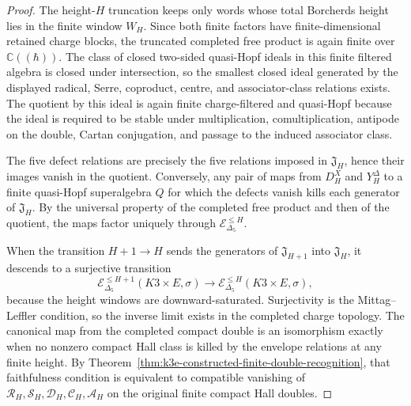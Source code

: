 \begin{proof}
The height-\(H\) truncation keeps only words whose total Borcherds
height lies in the finite window \(W_H\). Since both finite factors have
finite-dimensional retained charge blocks, the truncated completed free
product is again finite over \(\mathbb C((\hbar))\). The class of closed
two-sided quasi-Hopf ideals in this finite filtered algebra is closed
under intersection, so the smallest closed ideal generated by the
displayed radical, Serre, coproduct, centre, and associator-class
relations exists. The quotient by this ideal is again finite
charge-filtered and quasi-Hopf because the ideal is required to be
stable under multiplication, comultiplication, antipode on the double,
Cartan conjugation, and passage to the induced associator class.

The five defect relations are precisely the five relations imposed in
\(\mathfrak J_H\), hence their images vanish in the quotient. Conversely,
any pair of maps from \(D_H^X\) and \(Y_H^\Delta\) to a finite
quasi-Hopf superalgebra \(Q\) for which the defects vanish kills each
generator of \(\mathfrak J_H\). By the universal property of the
completed free product and then of the quotient, the maps factor
uniquely through \(\mathcal E^{\leq H}_{\Delta_5}\).

When the transition \(H+1\to H\) sends the generators of
\(\mathfrak J_{H+1}\) into \(\mathfrak J_H\), it descends to a
surjective transition
\[
 \mathcal E^{\leq H+1}_{\Delta_5}(K3\times E,\sigma)
 \longrightarrow
 \mathcal E^{\leq H}_{\Delta_5}(K3\times E,\sigma),
\]
because the height windows are downward-saturated. Surjectivity is the
Mittag--Leffler condition, so the inverse limit exists in the completed
charge topology. The canonical map from the completed compact double is
an isomorphism exactly when no nonzero compact Hall class is killed by
the envelope relations at any finite height. By
Theorem~\ref{thm:k3e-constructed-finite-double-recognition}, that
faithfulness condition is equivalent to compatible vanishing of
\(\mathcal R_H,\mathcal S_H,\mathcal D_H,\mathcal C_H,\mathcal A_H\) on
the original finite compact Hall doubles.
\end{proof}


